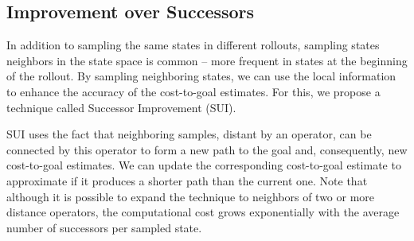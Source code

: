 \subsection{Improvement over Successors}
\label{sec:sui}

In addition to sampling the same states in different rollouts, sampling states neighbors in the state space is common -- more frequent in states at the beginning of the rollout. By sampling neighboring states, we can use the local information to enhance the accuracy of the cost-to-goal estimates. For this, we propose a technique called Successor Improvement (SUI).

SUI uses the fact that neighboring samples, distant by an operator, can be connected by this operator to form a new path to the goal and, consequently, new cost-to-goal estimates. We can update the corresponding cost-to-goal estimate to approximate \hstar if it produces a shorter path than the current one. Note that although it is possible to expand the technique to neighbors of two or more distance operators, the computational cost grows exponentially with the average number of successors per sampled state.






